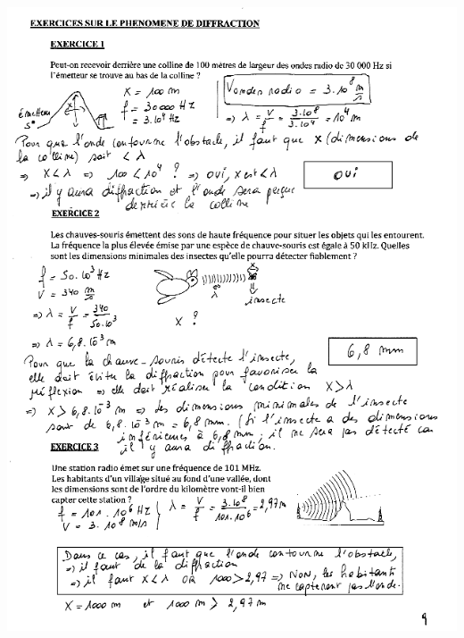 {\includegraphics[width=18.503cm,height=25.615cm]{Pictures/100000010000026F0000035E638B1FB4AD6FDEB0.png}

}
